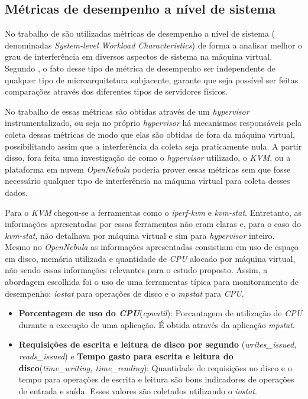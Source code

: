 \subsection{Métricas de desempenho a nível de sistema}
No trabalho de  são utilizadas métricas de desempenho a nível de sistema ( denominadas \textit{System-level Workload Characteristics}) de forma a analisar melhor o grau de interferência em diversos aspectos de sistema na máquina virtual. Segundo , o fato desse tipo de métrica de desempenho ser independente de qualquer tipo de microarquitetura subjacente, garante que seja possível ser feitas comparações através dos diferentes tipos de servidores físicos.

No trabalho de  essas métricas são obtidas através de um \textit{hypervisor} instrumentalizado, ou seja no próprio \textit{hypervisor} há mecanismos responsáveis pela coleta dessas métricas de modo que elas são obtidas de fora da máquina virtual, possibilitando assim que a interferência da coleta seja praticamente nula. A partir disso, fora feita uma investigação de como o \textit{hypervisor} utilizado, o \textit{KVM}, ou a plataforma em nuvem \textit{OpenNebula} poderia prover essas métricas sem que fosse necessário qualquer tipo de interferência na máquina virtual para coleta desses dados.

Para o \textit{KVM} chegou-se a ferramentas como o \textit{iperf-kvm} e \textit{kvm-stat}. Entretanto, as informações apresentadas por essas ferramentas não eram claras e, para o caso do \textit{kvm-stat}, não detalhava por máquina virtual e sim para  \textit{hypervisor} inteiro. Mesmo no \textit{OpenNebula} as informações apresentadas consistiam em uso de espaço em disco, memória utilizada e quantidade de \textit{CPU} alocado por máquina virtual, não sendo essas informações relevantes para o estudo proposto. Assim, a abordagem escolhida foi o uso de uma ferramentas típica para monitoramento de desempenho: \textit{iostat} para operações de disco e o \textit{mpstat} para \textit{CPU}. %

\begin{itemize}
\item \textbf{Porcentagem de uso do \textit{CPU}}(\textit{cpuutil}): Porcantagem de utilização de \textit{CPU} durante a execução de uma aplicação. É obtida através da aplicação \textit{mpstat}.

\item \textbf{Requisições de escrita e leitura de disco por segundo }(\textit{writes\_issued, reads\_issued}) e \textbf{Tempo gasto para escrita e leitura do disco}(\textit{time\_writing, time\_reading}): Quantidade de requisições no disco e o tempo para operações de escrita e leitura são bons indicadores de operações de entrada e saída. Esses valores são coletados utilizando o \textit{iostat}.

\end{itemize}


